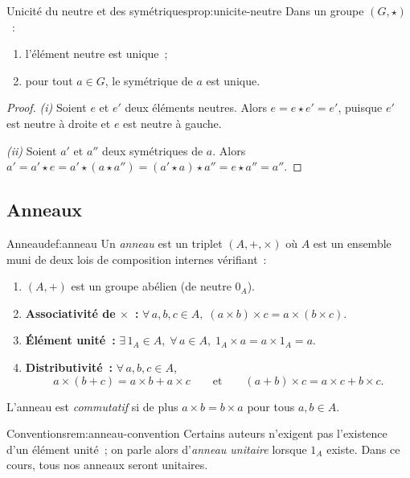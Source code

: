 \begin{proposition}{Unicité du neutre et des symétriques}{prop:unicite-neutre}
  Dans un groupe $(G,\star)$~:
  \begin{enumerate}[label=(\roman*)]
    \item l'élément neutre est unique~;
    \item pour tout $a\in G$, le symétrique de $a$ est unique.
  \end{enumerate}
\end{proposition}

\begin{proof}
  \emph{(i)} Soient $e$ et $e'$ deux éléments neutres. Alors
  $e = e\star e' = e'$, puisque $e'$ est neutre à droite et $e$ est
  neutre à gauche.

  \emph{(ii)} Soient $a'$ et $a''$ deux symétriques de $a$. Alors
  $a' = a'\star e = a'\star(a\star a'') = (a'\star a)\star a'' = e\star a'' = a''$.
\end{proof}

\subsection{Anneaux}\label{subsec:anneaux}

\begin{definition}{Anneau}{def:anneau}
  Un \emph{anneau} est un triplet $(A,+,\times)$ où $A$ est
  un ensemble muni de deux lois de composition internes vérifiant~:
  \begin{enumerate}[label=\textbf{(A\arabic*)}]
    \item $(A,+)$ est un groupe abélien (de neutre $0_A$).
    \item \textbf{Associativité de $\times$~:} $\forall\, a,b,c\in A,\;
      (a\times b)\times c = a\times(b\times c)$.
    \item \textbf{Élément unité~:} $\exists\, 1_A\in A,\;
      \forall\, a\in A,\; 1_A\times a = a\times 1_A = a$.
    \item \textbf{Distributivité~:} $\forall\, a,b,c\in A$,
      \[
        a\times(b+c)=a\times b + a\times c
        \qquad\text{et}\qquad
        (a+b)\times c = a\times c + b\times c.
      \]
  \end{enumerate}
  L'anneau est \emph{commutatif} si de plus
  $a\times b = b\times a$ pour tous $a,b\in A$.
\end{definition}

\begin{remark}{Conventions}{rem:anneau-convention}
  Certains auteurs n'exigent pas l'existence d'un élément unité~; on
  parle alors d'\emph{anneau unitaire} lorsque $1_A$ existe. Dans ce
  cours, tous nos anneaux seront unitaires.
\end{remark}

